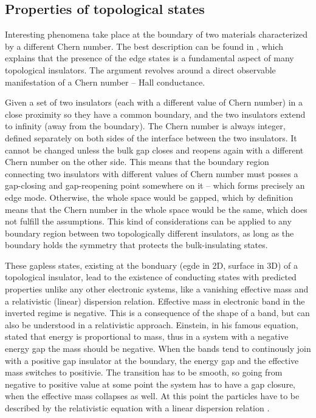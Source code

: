\documentclass[titlepage,a4paper]{book}
\newcommand{\wciecie}{\quad\phantom{v}}
\begin{document}
\subsection{Properties of topological states}
\wciecie
Interesting phenomena take place at the boundary of two materials characterized by a different Chern number. The best description can be found in \cite{Bernevig_book}, which explains that the presence of the edge states is a fundamental aspect of many topological insulators. The argument revolves around a direct observable manifestation of a Chern number -- Hall conductance.

Given a set of two insulators (each with a different value of Chern number) in a close proximity so they have a common boundary, and the two insulators extend to infinity (away from the boundary). The Chern number is always integer, defined separately on both sides of the interface between the two insulators. It cannot be changed unless the bulk gap closes and reopens again with a different Chern number on the other side. This means that the boundary region connecting two insulators with different values of Chern number must posses a gap-closing and gap-reopening point somewhere on it -- which forms precisely an edge mode. Otherwise, the whole space would be gapped, which by definition means that the Chern number in the whole space would be the same, which does not fulfill the assumptions. This kind of considerations can be applied to any boundary region between two topologically different insulators, as long as the boundary holds the symmetry that protects the bulk-insulating states. 

These gapless states, existing at the bonduary (egde in 2D, surface in 3D) of a topological insulator, lead to the existence of conducting states with predicted properties unlike any other electronic systems, like a vanishing effective mass and a relativistic (linear) dispersion relation. Effective mass in electronic band in the inverted regime is negative. This is a consequence of the shape of a band, but can also be understood in a relativistic approach. Einstein, in his famous equation, stated that energy is proportional to mass, thus in a system with a negative energy gap the mass should be negative. When the bands tend to continously join with a positive gap insulator at the boundary, the energy gap and the effective mass switches to positivie. The transition has to be smooth, so going from negative to positive value at some point the system has to have a gap closure, when the effective mass collapses as well. At this point the particles have to be described by the relativistic equation with a linear dispersion relation \cite{Zawadzki_Topology}.
\end{document}
